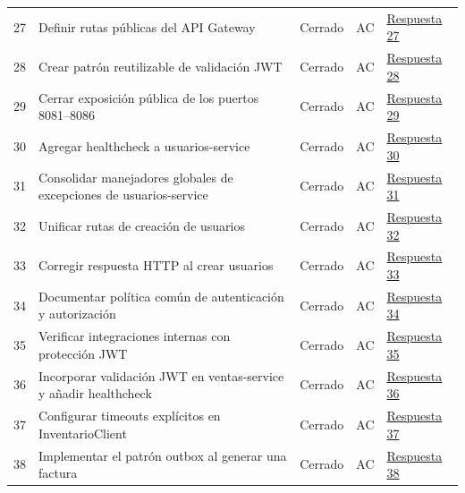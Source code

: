 \documentclass[12pt,a4paper]{article}
\begin{document}
{\begin{longtable}{p{0.6cm}p{6.8cm}p{1.7cm}p{1.1cm}p{2.8cm}}
27 & Definir rutas públicas del API Gateway & Cerrado & AC & \href{https://github.com/JoseLozanoMorales/TiendaTech/issues/27#issuecomment-5499481993}{Respuesta 27} \\
28 & Crear patrón reutilizable de validación JWT & Cerrado & AC & \href{https://github.com/JoseLozanoMorales/TiendaTech/issues/28#issuecomment-5499483824}{Respuesta 28} \\
29 & Cerrar exposición pública de los puertos 8081--8086 & Cerrado & AC & \href{https://github.com/JoseLozanoMorales/TiendaTech/issues/29#issuecomment-5499486242}{Respuesta 29} \\
30 & Agregar healthcheck a usuarios-service & Cerrado & AC & \href{https://github.com/JoseLozanoMorales/TiendaTech/issues/30#issuecomment-5499570043}{Respuesta 30} \\
31 & Consolidar manejadores globales de excepciones de usuarios-service & Cerrado & AC & \href{https://github.com/JoseLozanoMorales/TiendaTech/issues/31#issuecomment-5499572163}{Respuesta 31} \\
32 & Unificar rutas de creación de usuarios & Cerrado & AC & \href{https://github.com/JoseLozanoMorales/TiendaTech/issues/32#issuecomment-5499574333}{Respuesta 32} \\
33 & Corregir respuesta HTTP al crear usuarios & Cerrado & AC & \href{https://github.com/JoseLozanoMorales/TiendaTech/issues/33#issuecomment-5499576455}{Respuesta 33} \\
34 & Documentar política común de autenticación y autorización & Cerrado & AC & \href{https://github.com/JoseLozanoMorales/TiendaTech/issues/34#issuecomment-5499578395}{Respuesta 34} \\
35 & Verificar integraciones internas con protección JWT & Cerrado & AC & \href{https://github.com/JoseLozanoMorales/TiendaTech/issues/35#issuecomment-5499580121}{Respuesta 35} \\
36 & Incorporar validación JWT en ventas-service y añadir healthcheck & Cerrado & AC & \href{https://github.com/JoseLozanoMorales/TiendaTech/issues/36#issuecomment-5499544030}{Respuesta 36} \\
37 & Configurar timeouts explícitos en InventarioClient & Cerrado & AC & \href{https://github.com/JoseLozanoMorales/TiendaTech/issues/37#issuecomment-5499542065}{Respuesta 37} \\
38 & Implementar el patrón outbox al generar una factura & Cerrado & AC & \href{https://github.com/JoseLozanoMorales/TiendaTech/issues/38#issuecomment-5499545660}{Respuesta 38} \\

\end{longtable}}
\end{document}
